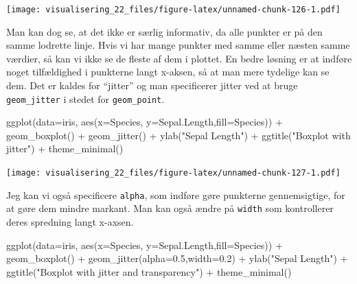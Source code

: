 \documentclass[
]{book}
\newenvironment{Shaded}{\begin{snugshade}}{\end{snugshade}}
\newcommand{\AttributeTok}[1]{\textcolor[rgb]{0.77,0.63,0.00}{#1}}
\newcommand{\FloatTok}[1]{\textcolor[rgb]{0.00,0.00,0.81}{#1}}
\newcommand{\FunctionTok}[1]{\textcolor[rgb]{0.00,0.00,0.00}{#1}}
\newcommand{\NormalTok}[1]{#1}
\newcommand{\SpecialCharTok}[1]{\textcolor[rgb]{0.00,0.00,0.00}{#1}}
\newcommand{\StringTok}[1]{\textcolor[rgb]{0.31,0.60,0.02}{#1}}
\begin{document}
\texttt{[image: visualisering\_22\_files/figure-latex/unnamed-chunk-126-1.pdf]}

Man kan dog se, at det ikke er særlig informativ, da alle punkter er på den samme lodrette linje. Hvis vi har mange punkter med samme eller næsten samme værdier, så kan vi ikke se de fleste af dem i plottet. En bedre løsning er at indføre noget tilfældighed i punkterne langt x-aksen, så at man mere tydelige kan se dem. Det er kaldes for ``jitter'' og man specificerer jitter ved at bruge \texttt{geom\_jitter} i stedet for \texttt{geom\_point}.

\begin{Shaded}
\begin{Highlighting}[]
\FunctionTok{ggplot}\NormalTok{(}\AttributeTok{data=}\NormalTok{iris, }\FunctionTok{aes}\NormalTok{(}\AttributeTok{x=}\NormalTok{Species, }\AttributeTok{y=}\NormalTok{Sepal.Length,}\AttributeTok{fill=}\NormalTok{Species)) }\SpecialCharTok{+} 
  \FunctionTok{geom\_boxplot}\NormalTok{() }\SpecialCharTok{+} 
  \FunctionTok{geom\_jitter}\NormalTok{() }\SpecialCharTok{+}
  \FunctionTok{ylab}\NormalTok{(}\StringTok{"Sepal Length"}\NormalTok{) }\SpecialCharTok{+} 
  \FunctionTok{ggtitle}\NormalTok{(}\StringTok{"Boxplot with jitter"}\NormalTok{) }\SpecialCharTok{+} 
  \FunctionTok{theme\_minimal}\NormalTok{()}
\end{Highlighting}
\end{Shaded}

\texttt{[image: visualisering\_22\_files/figure-latex/unnamed-chunk-127-1.pdf]}

Jeg kan vi også specificere \texttt{alpha}, som indføre gøre punkterne gennemsigtige, for at gøre dem mindre markant. Man kan også ændre på \texttt{width} som kontrollerer deres spredning langt x-axsen.

\begin{Shaded}
\begin{Highlighting}[]
\FunctionTok{ggplot}\NormalTok{(}\AttributeTok{data=}\NormalTok{iris, }\FunctionTok{aes}\NormalTok{(}\AttributeTok{x=}\NormalTok{Species, }\AttributeTok{y=}\NormalTok{Sepal.Length,}\AttributeTok{fill=}\NormalTok{Species)) }\SpecialCharTok{+} 
  \FunctionTok{geom\_boxplot}\NormalTok{() }\SpecialCharTok{+} 
  \FunctionTok{geom\_jitter}\NormalTok{(}\AttributeTok{alpha=}\FloatTok{0.5}\NormalTok{,}\AttributeTok{width=}\FloatTok{0.2}\NormalTok{) }\SpecialCharTok{+}
  \FunctionTok{ylab}\NormalTok{(}\StringTok{"Sepal Length"}\NormalTok{) }\SpecialCharTok{+} 
  \FunctionTok{ggtitle}\NormalTok{(}\StringTok{"Boxplot with jitter and transparency"}\NormalTok{) }\SpecialCharTok{+} 
  \FunctionTok{theme\_minimal}\NormalTok{()}
\end{Highlighting}
\end{Shaded}
\end{document}
